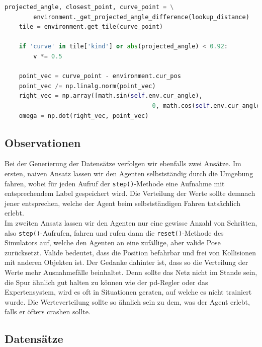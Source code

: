 \begin{minipage}{\linewidth}
	\begin{lstlisting}[caption={Berechnung eines Steuerbefehls mit einfachem Expertensystem}, language=python]
	projected_angle, closest_point, curve_point = \
		environment._get_projected_angle_difference(lookup_distance)
	tile = environment.get_tile(curve_point)
	
	if 'curve' in tile['kind'] or abs(projected_angle) < 0.92:
		v *= 0.5
	
	point_vec = curve_point - environment.cur_pos
	point_vec /= np.linalg.norm(point_vec)
	right_vec = np.array([math.sin(self.env.cur_angle), 
									     0, math.cos(self.env.cur_angle)])
	omega = np.dot(right_vec, point_vec)
	\end{lstlisting}
\end{minipage}

\subsection{Observationen}

Bei der Generierung der Datensätze verfolgen wir ebenfalls zwei Ansätze. Im ersten, naiven Ansatz lassen wir den Agenten selbstständig durch die Umgebung fahren, wobei für jeden Aufruf der \texttt{step()}-Methode eine Aufnahme mit entsprechendem Label gespeichert wird. Die Verteilung der Werte sollte demnach jener entsprechen, welche der Agent beim selbstständigen Fahren tatsächlich erlebt. \\

Im zweiten Ansatz lassen wir den Agenten nur eine gewisse Anzahl von Schritten, also \texttt{step()}-Aufrufen, fahren und rufen dann die \texttt{reset()}-Methode des Simulators auf, welche den Agenten an eine zufällige, aber valide Pose zurücksetzt. Valide bedeutet, dass die Position befahrbar und frei von Kollisionen mit anderen Objekten ist.
Der Gedanke dahinter ist, dass so die Verteilung der Werte mehr \glqq Ausnahmefälle\grqq{} beinhaltet. Denn sollte das Netz nicht im Stande sein, die Spur ähnlich gut halten zu können wie der \acs{pd}-Regler oder das Expertensystem, wird es oft in Situationen geraten, auf welche es nicht trainiert wurde. Die Werteverteilung sollte so ähnlich sein zu dem, was der Agent erlebt, falls er öfters \glqq crashen\grqq{} sollte.

\subsection{Datensätze}

